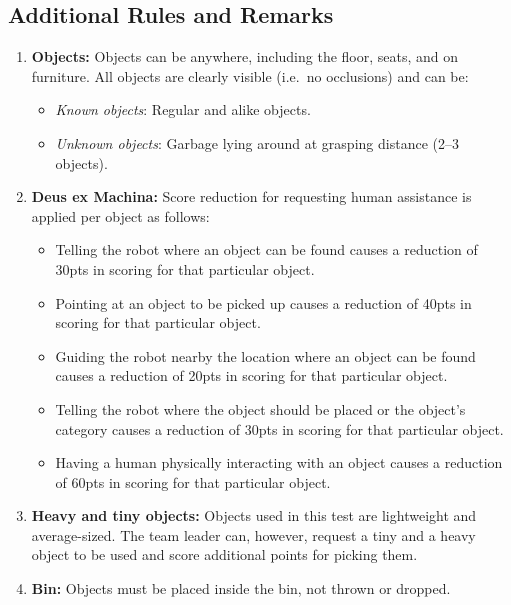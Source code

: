 \subsection*{Additional Rules and Remarks}
\begin{enumerate}[nosep]
	\item \textbf{Objects:}
	Objects can be anywhere, including the floor, seats, and on furniture.
	All objects are clearly visible (i.e.~no occlusions) and can be:
	\begin{itemize}[nosep]
		\item\textit{Known objects}: Regular and alike objects.
		\item\textit{Unknown objects}: Garbage lying around at grasping distance (2--3 objects).
	\end{itemize}

	\item \textbf{Deus ex Machina:} Score reduction for requesting human assistance is applied per object as follows:
	\begin{itemize}[nosep]
		\item Telling the robot where an object can be found causes a reduction of 30pts in scoring for that particular object.

		\item Pointing at an object to be picked up causes a reduction of 40pts in scoring for that particular object.

		\item Guiding the robot nearby the location where an object can be found causes a reduction of 20pts in scoring for that particular object.

		\item Telling the robot where the object should be placed or the object's category causes a reduction of 30pts in scoring for that particular object.

		\item Having a human physically interacting with an object causes a reduction of 60pts in scoring for that particular object.
	\end{itemize}

	\item \textbf{Heavy and tiny objects:} Objects used in this test are lightweight and average-sized.
	The team leader can, however, request a tiny and a heavy object to be used and score additional points for picking them.

	\item \textbf{Bin:} Objects must be placed inside the bin, not thrown or dropped.
\end{enumerate}

